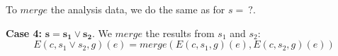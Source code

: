 To $merge$ the analysis data, we do the same as for $s =\ ?$.

\medskip

\textbf{Case 4:} $\bm{s = s_1 \lor s_2}$. We $merge$ the results from $s_1$ and $s_2$:
\small
$$ E(c, s_1 \lor s_2, g)(e) = merge(E(c, s_1, g)(e), E(c, s_2, g)(e)) $$
\normalsize


